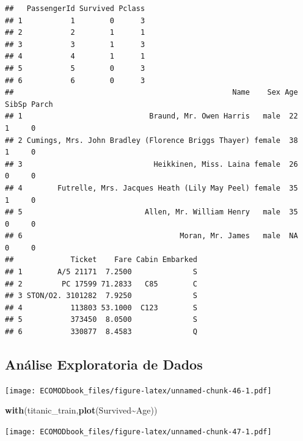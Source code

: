 \documentclass[
]{book}
\newenvironment{Shaded}{\begin{snugshade}}{\end{snugshade}}
\newcommand{\FunctionTok}[1]{\textcolor[rgb]{0.13,0.29,0.53}{\textbf{#1}}}
\newcommand{\NormalTok}[1]{#1}
\newcommand{\SpecialCharTok}[1]{\textcolor[rgb]{0.81,0.36,0.00}{\textbf{#1}}}
\begin{document}
\begin{verbatim}
##   PassengerId Survived Pclass
## 1           1        0      3
## 2           2        1      1
## 3           3        1      3
## 4           4        1      1
## 5           5        0      3
## 6           6        0      3
##                                                  Name    Sex Age SibSp Parch
## 1                             Braund, Mr. Owen Harris   male  22     1     0
## 2 Cumings, Mrs. John Bradley (Florence Briggs Thayer) female  38     1     0
## 3                              Heikkinen, Miss. Laina female  26     0     0
## 4        Futrelle, Mrs. Jacques Heath (Lily May Peel) female  35     1     0
## 5                            Allen, Mr. William Henry   male  35     0     0
## 6                                    Moran, Mr. James   male  NA     0     0
##             Ticket    Fare Cabin Embarked
## 1        A/5 21171  7.2500              S
## 2         PC 17599 71.2833   C85        C
## 3 STON/O2. 3101282  7.9250              S
## 4           113803 53.1000  C123        S
## 5           373450  8.0500              S
## 6           330877  8.4583              Q
\end{verbatim}

\hypertarget{anuxe1lise-exploratoria-de-dados}{%
\subsection{Análise Exploratoria de Dados}\label{anuxe1lise-exploratoria-de-dados}}

\begin{Shaded}
\end{Shaded}

\texttt{[image: ECOMODbook\_files/figure-latex/unnamed-chunk-46-1.pdf]}

\begin{Shaded}
\begin{Highlighting}[]
\FunctionTok{with}\NormalTok{(titanic\_train,}\FunctionTok{plot}\NormalTok{(Survived}\SpecialCharTok{\textasciitilde{}}\NormalTok{Age))}
\end{Highlighting}
\end{Shaded}

\texttt{[image: ECOMODbook\_files/figure-latex/unnamed-chunk-47-1.pdf]}
\end{document}
